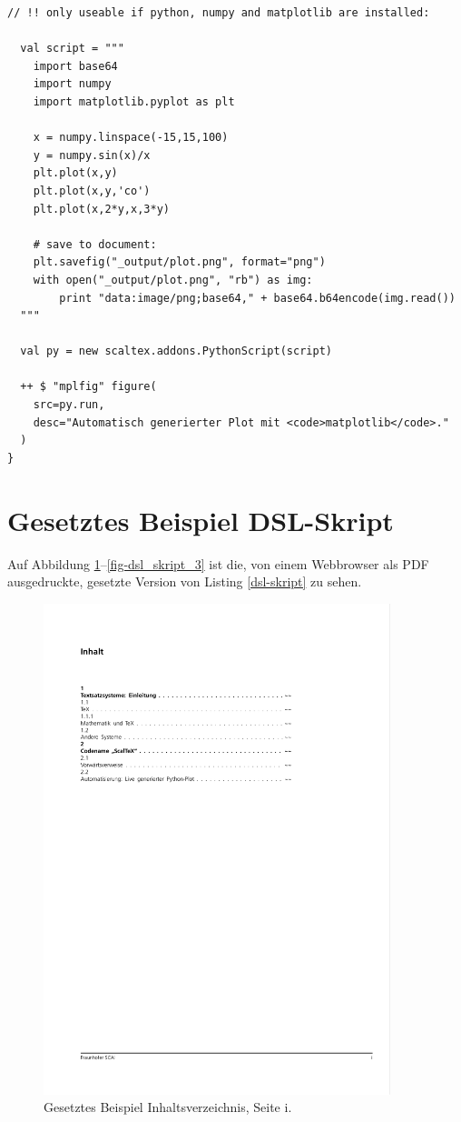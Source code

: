 \begin{lstlisting}[label=dsl-skript,caption=Ausführliches Scala DSL Dokument-Skript.]
  // !! only useable if python, numpy and matplotlib are installed:

  val script = """
    import base64
    import numpy
    import matplotlib.pyplot as plt

    x = numpy.linspace(-15,15,100)
    y = numpy.sin(x)/x
    plt.plot(x,y)
    plt.plot(x,y,'co')
    plt.plot(x,2*y,x,3*y)

    # save to document:
    plt.savefig("_output/plot.png", format="png")
    with open("_output/plot.png", "rb") as img:
        print "data:image/png;base64," + base64.b64encode(img.read())
  """

  val py = new scaltex.addons.PythonScript(script)

  ++ $ "mplfig" figure(
    src=py.run,
    desc="Automatisch generierter Plot mit <code>matplotlib</code>."
  )
}
\end{lstlisting}

\section{Gesetztes Beispiel DSL-Skript}

Auf Abbildung \ref{fig-dsl_skript_0}--\ref{fig-dsl_skript_3} ist die, von einem Webbrowser als PDF ausgedruckte, gesetzte Version von Listing \ref{dsl-skript} zu sehen.

\begin{figure}[h!]
  \centering
    \includegraphics[width=0.9\textwidth]{figures/dsl_skript_0.pdf}
  \caption{Gesetztes Beispiel Inhaltsverzeichnis, Seite i.}\label{fig-dsl_skript_0}
\end{figure}

